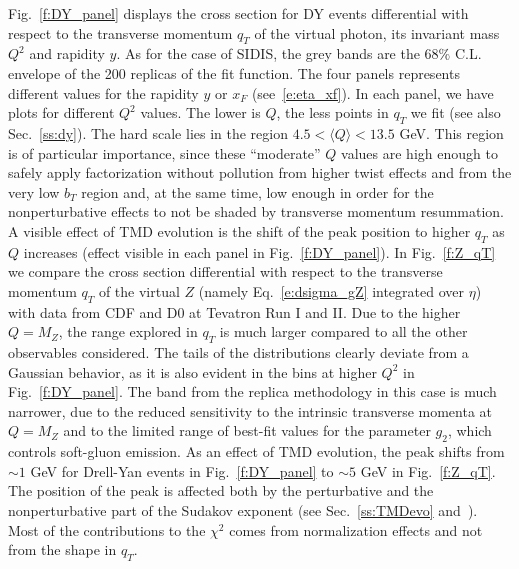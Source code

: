 \documentclass[aps,preprintnumbers,showpacs,nofootinbib,superscriptaddress,floatfix]{revtex4}
\begin{document}

Fig.~\ref{f:DY_panel} displays the cross section for DY events differential with respect to the transverse momentum $q_T$ of the virtual photon, its invariant mass $Q^2$ and rapidity $y$.  
As for the case of SIDIS, the grey bands are the $68\%$ C.L. envelope of the 200 replicas of the fit function. The four panels represents different values for the rapidity $y$ or $x_F$ (see~\eqref{e:eta_xf}). In each panel, we have plots for different $Q^2$ values.
The lower is $Q$, the less points in $q_T$ we fit (see also Sec.~\ref{ss:dy}). 
The hard scale lies in the region $4.5 < \langle Q \rangle < 13.5$ GeV. This region is of particular importance, since these ``moderate'' $Q$ values are high enough to safely apply factorization without pollution from higher twist effects and from the very low $b_T$ region and, at the same time, low enough in order for the nonperturbative effects to not be shaded by transverse momentum resummation.
A visible effect of TMD evolution is the shift of the peak position to higher $q_T$ as $Q$ increases (effect visible in each panel in Fig.~\ref{f:DY_panel}). 
In Fig.~\ref{f:Z_qT} we compare the cross section differential with respect to the transverse momentum $q_T$ of the virtual $Z$ (namely Eq.~\eqref{e:dsigma_gZ} integrated over $\eta$) with data from CDF and D0 at Tevatron Run I and II. 
Due to the higher $Q = M_Z$, the range explored in $q_T$ is much larger compared to all the other observables considered. The tails of the distributions clearly deviate from a Gaussian behavior, as it is also evident in the bins at higher $Q^2$ in Fig.~\ref{f:DY_panel}. The band from the replica methodology in this case is much narrower, due to the reduced sensitivity to the intrinsic transverse momenta at $Q=M_Z$ and to the limited range of best-fit values for the parameter $g_2$, which controls soft-gluon emission. 
As an effect of TMD evolution, the peak shifts from $\sim 1$ GeV for Drell-Yan events in Fig.~\ref{f:DY_panel} to $\sim 5$ GeV in Fig.~\ref{f:Z_qT}. The position of the peak is affected both by the perturbative and the nonperturbative part of the Sudakov exponent (see Sec.~\ref{ss:TMDevo} and~\cite{Signori:2016lvd}).
Most of the contributions to the $\chi^2$ comes from normalization effects and not from the shape in $q_T$. 
\end{document}
